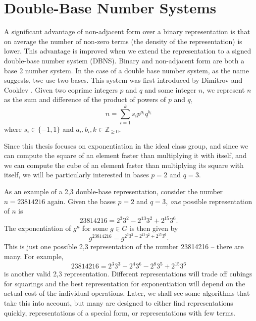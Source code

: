 \documentclass{ucalgthes1}
\theoremstyle{plain}
\theoremstyle{definition}
\newcommand{\ZZgez}{\mathbb{Z}_{\ge 0}}
\begin{document}
\bigbreak
\section{Double-Base Number Systems}\label{section:dbns}

A significant advantage of non-adjacent form over a binary representation is that on average the number of non-zero terms (the density of the representation) is lower.  This advantage is improved when we extend the representation to a signed double-base number system (DBNS).  Binary and non-adjacent form are both a base 2 number system.  In the case of a double base number system, as the name suggests, twe use two bases.  This system was first introduced by Dimitrov and Cooklev \cite{Dimitrov1995}.  Given two coprime integers $p$ and $q$ and some integer $n$, we represent $n$ as the sum and difference of the product of powers of $p$ and $q$,
\begin{equation}\label{eq:generalDbnsForm}
	n = \sum_{i=1}^k s_i p^{a_i} q^{b_i}
\end{equation}
where $s_i \in \{-1, 1\}$ and $a_i, b_i, k \in \ZZgez$.

Since this thesis focuses on exponentiation in the ideal class group, and since we can compute the square of an element faster than multiplying it with itself, and we can compute the cube of an element faster than multiplying its square with itself, we will be particularly interested in bases $p=2$ and $q=3$.

As an example of a 2,3 double-base representation, consider the number $n=23814216$ again.  Given the bases $p=2$ and $q=3$, \emph{one} possible representation of $n$ is
\begin{equation}\label{eq:chainedEg}
	23814216 = 2^3 3^2 -2^{13} 3^2 +2^{15} 3^6.
\end{equation}
The exponentiation of $g^n$ for some $g \in G$ is then given by
\[
	g^{23814216} = g^{2^3 3^2 -2^{13} 3^2 +2^{15} 3^6}.
\]
This is just one possible 2,3 representation of the number 23814216 -- there are many.  For example,
\begin{equation}\label{eq:unchainedEg}
	23814216 = 2^3 3^3 - 2^4 3^6 - 2^8 3^5 + 2^{15} 3^6
\end{equation}
is another valid 2,3 representation.  Different representations will trade off cubings for squarings and the best representation for exponentiation will depend on the actual cost of the individual operations.  Later, we shall see some algorithms that take this into account, but many are designed to either find representations quickly, representations of a special form, or representations with few terms.
\end{document}
